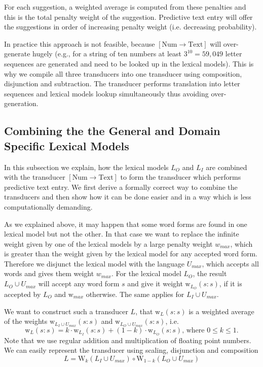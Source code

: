 \documentclass[a4paper,conference]{IEEEtran}
\begin{document}
For each suggestion, a weighted average is computed from these
penalties and this is the total penalty weight of the
suggestion. Predictive text entry will offer the suggestions in order
of increasing penalty weight (i.e. decreasing probability).

In practice this approach is not feasible, because
$[\mathrm{Num}\rightarrow\mathrm{Text}]$ will over-generate hugely
(e.g., for a string of ten numbers at least $3^{10} = 59,049$ letter
sequences are generated and need to be looked up in the
lexical models). This is why we compile all three transducers into one
transducer using composition, disjunction and subtraction. The
transducer performs translation into letter sequences and lexical models
lookup simultaneously thus avoiding over-generation.

\subsection{Combining the the General and Domain Specific Lexical Models}

In this subsection we explain, how the lexical models $L_O$ and $L_I$ are
combined with the transducer $[\mathrm{Num}\rightarrow\mathrm{Text}]$
to form the transducer which performs predictive text entry. We first
derive a formally correct way to combine the transducers and then show
how it can be done easier and in a way which is less computationally
demanding.

As we explained above, it may happen that some word forms are found in
one lexical model but not the other. In that case we want to replace the
infinite weight given by one of the lexical models by a large penalty weight
$w_{max}$, which is greater than the weight given by the lexical model for
any accepted word form. Therefore we disjunct the lexical model with the
language $U_{max}$, which accepts all words and gives them weight
$w_{max}$. For the lexical model $L_O$, the result $L_O \cup U_{max}$ will
accept any word form $s$ and give it weight
$\mathrm{w}_{L_O}(s\mathrm{:}s)$, if it is accepted by $L_O$ and
$\mathrm{w}_{max}$ otherwise. The same applies for $L_I \cup U_{max}$.

We want to construct such a transducer $L$, that $\mathrm{w}_L(s\mathrm{:}s)$
is a weighted average of the weights $\mathrm{w}_{L_I \cup U_{max}}(s\mathrm{:}s)$ and
$\mathrm{w}_{L_O \cup U_{max}}(s\mathrm{:}s)$, i.e.
\begin{equation}
  \mathrm{w}_L(s\mathrm{:}s) = k\cdot \mathrm{w}_{L_I}(s\mathrm{:}s) + (1 - k)\cdot \mathrm{w}_{L_O}(s\mathrm{:}s)\text{, where }0\leq k \leq 1\text{.}
\end{equation}
Note that we use regular addition and multiplication of floating
point numbers. We can easily represent the transducer using scaling, disjunction and composition
\begin{equation}
  L = \mathrm{W}_k(L_I \cup U_{max}) \circ \mathrm{W}_{1-k}(L_O \cup U_{max})
\end{equation}
\end{document}
